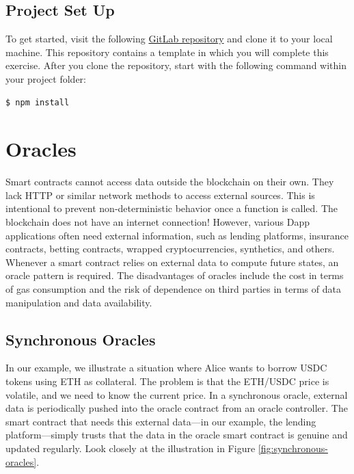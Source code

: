 \documentclass[12pt]{article}
\begin{document}

\subsection*{Project Set Up}

To get started, visit the following \href{https://gitlab.fel.cvut.cz/radovluk/smart-contracts-exercises/-/tree/main/06-Fool-the-Oracle/task/task-code}{GitLab repository} and clone it to your local machine. This repository contains a template in which you will complete this exercise. After you clone the repository, start with the following command within your project folder:

\begin{verbatim}
$ npm install
\end{verbatim}

\section{Oracles}
Smart contracts cannot access data outside the blockchain on their own. They lack HTTP or similar network methods to access external sources. This is intentional to prevent non-deterministic behavior once a function is called. The blockchain does not have an internet connection! However, various Dapp applications often need external information, such as lending platforms, insurance contracts, betting contracts, wrapped cryptocurrencies, synthetics, and others. Whenever a smart contract relies on external data to compute future states, an oracle pattern is required. The disadvantages of oracles include the cost in terms of gas consumption and the risk of dependence on third parties in terms of data manipulation and data availability.

\subsection*{Synchronous Oracles}

In our example, we illustrate a situation where Alice wants to borrow USDC tokens using ETH as collateral. The problem is that the ETH/USDC price is volatile, and we need to know the current price. In a synchronous oracle, external data is periodically pushed into the oracle contract from an oracle controller. The smart contract that needs this external data—in our example, the lending platform—simply trusts that the data in the oracle smart contract is genuine and updated regularly. Look closely at the illustration in Figure \ref{fig:synchronous-oracles}. %
\end{document}

